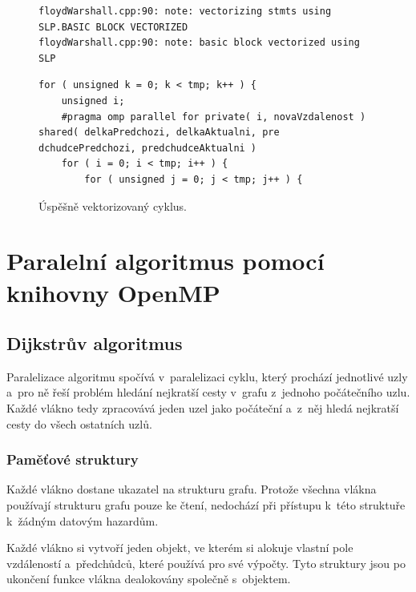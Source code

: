 \begin{figure}
    \centering
    \caption{Úspěšně vektorizovaný cyklus.}
	\label{f:fw:vect1}
    \begin{lstlisting}
floydWarshall.cpp:90: note: vectorizing stmts using SLP.BASIC BLOCK VECTORIZED
floydWarshall.cpp:90: note: basic block vectorized using SLP
    \end{lstlisting}
    
	\begin{lstlisting}
for ( unsigned k = 0; k < tmp; k++ ) {
	unsigned i;
	#pragma omp parallel for private( i, novaVzdalenost ) shared( delkaPredchozi, delkaAktualni, pre    dchudcePredchozi, predchudceAktualni )
	for ( i = 0; i < tmp; i++ ) {
		for ( unsigned j = 0; j < tmp; j++ ) {
	\end{lstlisting}
\end{figure}




\section{Paralelní algoritmus pomocí knihovny OpenMP}

\subsection{Dijkstrův algoritmus} \label{l:omp:dij}
Paralelizace algoritmu spočívá v~paralelizaci cyklu, který prochází jednotlivé uzly a~pro ně řeší problém hledání nejkratší cesty v~grafu z~jednoho počátečního uzlu. Každé vlákno tedy zpracovává jeden uzel jako počáteční a~z~něj hledá nejkratší cesty do všech ostatních uzlů.

\subsubsection{Paměťové struktury}
Každé vlákno dostane ukazatel na strukturu grafu. Protože všechna vlákna používají strukturu grafu pouze ke čtení, nedochází při přístupu k~této struktuře k~žádným datovým hazardům.

Každé vlákno si vytvoří jeden objekt, ve kterém si alokuje vlastní pole vzdáleností a~předchůdců, které používá pro své výpočty. Tyto struktury jsou po ukončení funkce vlákna dealokovány společně s~objektem.

